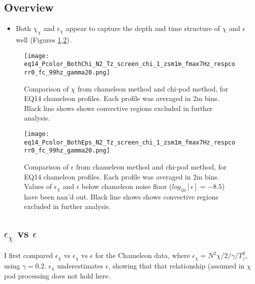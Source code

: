 \documentclass[11pt]{article}
\begin{document}
\subsection{Overview}



\begin{itemize}

\item Both $\chi_{\chi}$ and $\epsilon_{\chi}$ appear to capture the depth and time structure of $\chi$ and $\epsilon$ well (Figures \ref{chi_overview},\ref{eps_overview}).


\end{itemize}



\begin{figure}[htbp]
\texttt{[image: eq14\_Pcolor\_BothChi\_N2\_Tz\_screen\_chi\_1\_zsm1m\_fmax7Hz\_respcorr0\_fc\_99hz\_gamma20.png]}
\caption{Comparison of $\chi$ from chameleon method and chi-pod method, for EQ14 chameleon profiles. Each profile was averaged in 2m bins.  Black line shows shows convective regions excluded in further analysis.}
\label{chi_overview}
\end{figure}

\begin{figure}[htbp]
\texttt{[image: eq14\_Pcolor\_BothEps\_N2\_Tz\_screen\_chi\_1\_zsm1m\_fmax7Hz\_respcorr0\_fc\_99hz\_gamma20.png]}
\caption{Comparison of $\epsilon$ from chameleon method and chi-pod method, for EQ14 chameleon profiles. Each profile was averaged in 2m bins.  Values of $\epsilon_{\chi}$ and $\epsilon$ below chameleon noise floor ($log_{10}[\epsilon]=-8.5$) have been nan'd out. Black line shows shows convective regions excluded in further analysis.}
\label{eps_overview}
\end{figure}






\clearpage
\subsection{$\epsilon_{\chi}$ vs $\epsilon$}

I first compared $\epsilon_{\chi}$ vs $\epsilon_{\chi}$ vs $\epsilon$ for the Chameleon data, where $\epsilon_{\chi}=N^2\chi/2/\gamma/T_{z}^{2}$, using $\gamma=0.2$. $\epsilon_{\chi}$ underestimates $\epsilon$, showing that that relationship (assumed in $\chi$pod processing does not hold here.
\end{document}
